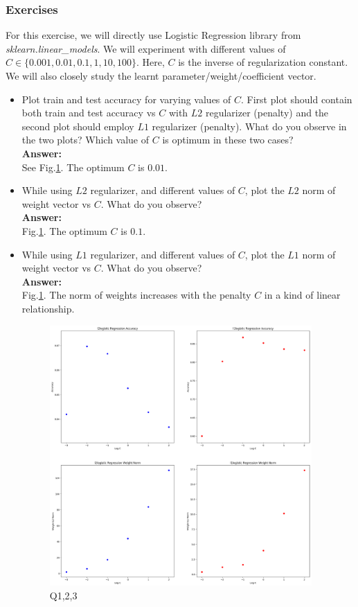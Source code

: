 \documentclass{article}
\begin{document}
\subsubsection*{Exercises}

For this exercise, we will directly use Logistic Regression library from \textit{sklearn.linear\_models}. We will experiment with different values of $C \in \{0.001,0.01,0.1,1,10,100\}$. Here, $C$ is the inverse of regularization constant. We will also closely study the learnt parameter/weight/coefficient vector.
\begin{itemize}
	\item Plot train and test accuracy for varying values of $C$. First plot should contain both train and test accuracy vs $C$ with $L2$ regularizer (penalty) and the second plot should employ $L1$ regularizer (penalty). What do you observe in the two plots? Which value of $C$ is optimum in these two cases?
	\\\textbf{Answer:}\\
	See Fig.\ref{fig:q123}. The optimum $C$ is $0.01$.
	
	\item While using $L2$ regularizer, and different values of $C$, plot the $L2$ norm of weight vector vs $C$. What do you observe?
	\\\textbf{Answer:}\\
	Fig.\ref{fig:q123}. The optimum $C$ is $0.1$.
	
	\item While using $L1$ regularizer, and different values of $C$, plot the $L1$ norm of weight vector vs $C$. What do you observe?
	\\\textbf{Answer:}\\
	Fig.\ref{fig:q123}. The norm of weights increases with the penalty $C$ in a kind of linear relationship.
	
	\begin{figure}[!h]
		\centering
		\includegraphics[width=10cm]{./Python/result1.png}
		\caption{Q1,2,3}
		\label{fig:q123}
	\end{figure}
	

\end{itemize}
\end{document}
